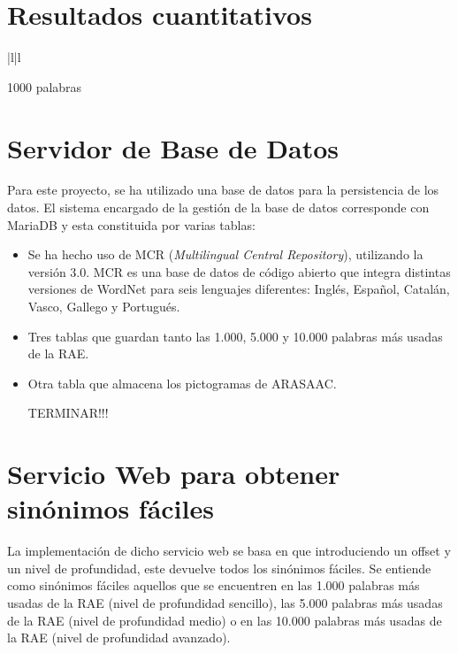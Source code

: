 \section{Resultados cuantitativos}
\label{cap:sec:pruebaCuantitativa}

\begin{table}
\centering
\begin{tabular}{|l|l}
	
	 {1000 palabras}\\ 
	
\end{tabular}
\end{table}


\section{Servidor de Base de Datos}
Para este proyecto, se ha utilizado una base de datos para la persistencia de los datos. El sistema encargado de la gestión de la base de datos corresponde con MariaDB y esta constituida por varias tablas:
\begin{itemize}
	\item Se ha hecho uso de MCR (\textit{Multilingual Central Repository}), utilizando la versión 3.0. MCR es una base de datos de código abierto que integra distintas versiones de WordNet para seis lenguajes diferentes: Inglés, Español, Catalán, Vasco, Gallego y Portugués. 
	\item Tres tablas que guardan tanto las 1.000, 5.000 y 10.000 palabras más usadas de la RAE.
	\item Otra tabla que almacena los pictogramas de ARASAAC. 
	
	
	
	TERMINAR!!! 
\end{itemize}


\section{Servicio Web  para obtener sinónimos fáciles}

La implementación de dicho servicio web se basa en que introduciendo un offset y un nivel de profundidad, este devuelve todos los sinónimos fáciles. Se entiende como sinónimos fáciles aquellos que se encuentren en las 1.000 palabras más usadas de la RAE (nivel de profundidad sencillo), las 5.000 palabras más usadas de la RAE (nivel de profundidad medio) o en las 10.000 palabras más usadas de la RAE (nivel de profundidad avanzado).

